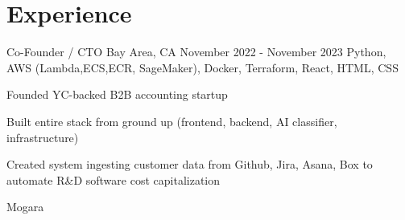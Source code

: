 \documentclass[letterpaper]{simjega-resume}
\begin{document}






%
%

\section{Experience}
\jgsectionline

{Co-Founder / CTO}
{Bay Area, CA}
{November 2022 - November 2023}
{Python, AWS (Lambda,ECS,ECR, SageMaker), Docker, Terraform, React, HTML, CSS}
{\begin{tightitemize}
\item[] Founded YC-backed B2B accounting startup
\item[] Built entire stack from ground up (frontend, backend, AI classifier, infrastructure)
\item[] Created system ingesting customer data from Github, Jira, Asana, Box to automate R\&D software cost capitalization
\end{tightitemize}}
{Mogara}
\end{document}
